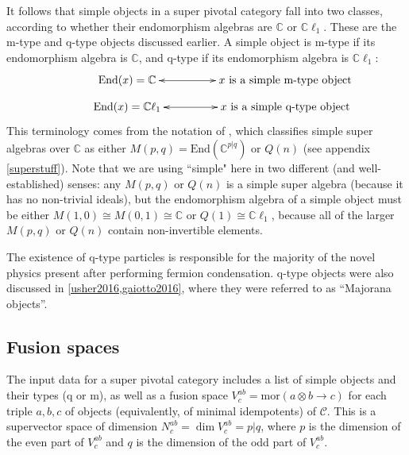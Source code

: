 \documentclass[12pt,a4paper]{article}
\newcommand{\tp}{\otimes}
\newcommand{\cc}{\mathbb{C}}
\newcommand{\mcc}{\mathcal{C}}
\newcommand{\zt}{\mathbb{Z}_2}
\newcommand{\mor}{\text{mor}}
\newcommand{\End}{\text{End}}
\newcommand{\cl}{\mathbb{C}\ell}
\newcommand{\kw}[1]{{\color{kwcolor}\footnotesize{(KW) #1}}}
\newcommand{\ethan}[1]{{\color{amethyst}\footnotesize{(EL) #1}}}
\begin{document}
It follows that simple objects in a super pivotal category fall into two classes, according to whether their endomorphism algebras are $\cc$ or $\cl_1$. 
These are the m-type and q-type objects discussed earlier. 
A simple object is {m-type} if its endomorphism algebra
is $\cc$, and {q-type} if its endomorphism algebra is $\cl_1$:
\begin{align}
\vcenter{\xymatrix @!0 @M=1mm @C=25mm{
& \text{End}(x) = \mathbb{C} \ar@{<->}[rr] &   &\text{$x$ is a simple m-type object}&  \\
&\text{End}(x) = \mathbb{C} \ell_1 \ar@{<->}[rr]  &  &\text{$x$ is a simple q-type object}&
	}}
\end{align}
This terminology comes from the notation of \cite{jozefiak1988}, which classifies simple super algebras over $\cc$ as either
$M(p,q) = \End(\cc^{p|q})$ or $Q(n)$ (see appendix \ref{superstuff}).
Note that we are using ``simple" here in two different (and well-established) senses: 
any $M(p,q)$ or $Q(n)$ is a simple super algebra
(because it has no non-trivial ideals), but the endomorphism algebra of a simple object must be either
$M(1,0) \cong M(0,1) \cong \cc$ or $Q(1) \cong \cl_1$,
because all of the larger $M(p,q)$ or $Q(n)$ contain non-invertible elements.

The existence of q-type particles is responsible for the majority of the novel physics present after performing fermion condensation. 
q-type objects were also discussed in \ref{usher2016,gaiotto2016}, where they were referred to as ``Majorana objects''. 



\subsection{Fusion spaces} \label{fusion_spaces}

The input data for a super pivotal category includes a list of simple objects and their types (q or m), 
as well as a fusion space $V^{ab}_c = \mor(a\tp b \to c)$ for each triple $a,b,c$ of objects (equivalently, of minimal idempotents)
of $\mcc$.
This is a supervector space of dimension
$N^{ab}_c = \dim V^{ab}_c = p|q$, where $p$ is the dimension of the even part
of $V^{ab}_c$ and $q$ is the dimension of the odd part of $V^{ab}_c$.
\end{document}
